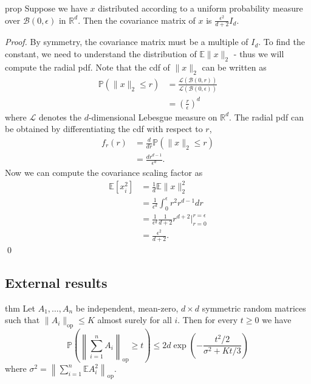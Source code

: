 \documentclass[11pt]{article}
\begin{document}
\begin{restatable}{prop}{} \label{prop: spherical cov}
    Suppose we have $x$ distributed according to a uniform probability measure over $\mathcal{B}(0,\epsilon)$ in $\mathbb{R}^d$. Then the covariance matrix of $x$ is $\frac{\epsilon^2}{d+2}I_d$. 
\end{restatable}
\noindent \textit{Proof.} By symmetry, the covariance matrix must be a multiple of $I_d$. To find the constant, we need to understand the distribution of $\mathbb{E}\|x\|_2$ - thus we will compute the radial pdf. Note that the cdf of $\|x\|_2$ can be written as
\begin{align*}
    \mathbb{P}(\|x\|_2 \leq r) &= \frac{\mathcal{L}(\mathcal{B}(0,r))}{\mathcal{L}(\mathcal{B}(0,\epsilon))} \\
    &= \left(\frac{r}{\epsilon }\right)^d
\end{align*}
where $\mathcal{L}$ denotes the $d$-dimensional Lebesgue measure on $\mathbb{R}^d$. The radial pdf can be obtained by differentiating the cdf with respect to $r$,
\begin{align*}
    f_r(r) &= \frac{d}{dr}\mathbb{P}(\|x\|_2\leq r) \\
    &= \frac{dr^{d-1}}{\epsilon^d}.
\end{align*}
Now we can compute the covariance scaling factor as 
\begin{align}
    \mathbb{E}[x_i^2] &= \frac{1}{d}\mathbb{E}\|x\|_2^2 \\
    &=\frac{1}{\epsilon^d}\int_{0}^{\epsilon}r^2r^{d-1}dr \\
    &= \frac{1}{\epsilon^d}\frac{1}{d+2}r^{d+2} \Bigg|^{r=\epsilon}_{r=0} \\
    &= \frac{\epsilon^2}{d+2}. \label{eq: uniform eps-ball coordinate variance}
\end{align}
\qed{}

\subsection{External results}

\begin{restatable}{thm}{}
    Let $A_1, \dots, A_n$ be independent, mean-zero, $d\times d$ symmetric random matrices such that $\|A_i\|_{\text{op}} \leq K$ almost surely for all $i$. Then for every $t \geq 0$ we have
    \[\mathbb{P}\left(\left\|\sum_{i = 1}^nA_i\right\|_{\text{op}} \geq t\right) \leq 2d\exp\left(-\frac{t^2/2}{\sigma^2 + Kt/3}\right)\]
    where $\sigma^2 = \left\|\sum_{i = 1}^n\mathbb{E}A_i^2\right\|_{\text{op}}$. \label{thm: matrix bernstein}
\end{restatable}


\end{document}
